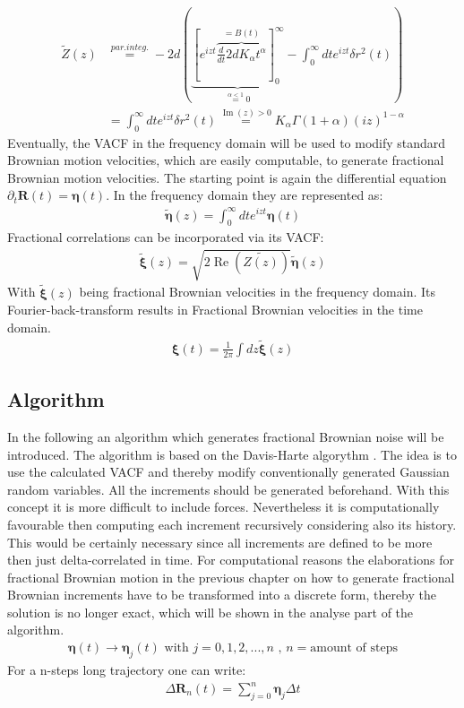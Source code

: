 \documentclass[
  a4paper,BCOR10mm,oneside,
  bibtotoc,idxtotoc,
  headsepline,footsepline,%
  fleqn,openbib
]{scrbook}
\begin{document}
\begin{align*}
 \tilde{Z}(z) & \stackrel{par. integ.}{=} - 2d \left( \underbrace{\left [ e^{izt}\overbrace{ \frac{d}{dt} 2dK_{\alpha}t^{\alpha}}^{=B(t)} \right]_{0}^{\infty}}_{\stackrel{\alpha < 1} {=} 0}-\int_{0}^{\infty} d t e^{izt} \delta r^2 (t) \right) \\
  & = \int_{0}^{\infty} d t e^{izt} \delta r^2 (t)  \stackrel{\operatorname{Im}(z)> 0} {=}  K_{\alpha} \Gamma(1+\alpha)(i z)^{1-\alpha}
\end{align*}
Eventually, the VACF in the frequency domain will be used to modify standard Brownian motion velocities, which are easily computable, to generate fractional Brownian motion velocities. The  starting point is again the differential equation $\partial_t \bm{R}(t)=\bm{\eta}(t)$. In the frequency domain they are represented as:
\begin{align}
 \tilde{\bm{\eta}}(z)=\int_{0}^{\infty} dt e^{izt} \bm{\eta}(t) \label{eq:fourier}
\end{align}
Fractional correlations can be incorporated via its VACF:
\begin{align}
\tilde{\bm{\xi}}(z) = \sqrt{2 \operatorname{Re} \left(\tilde{Z(z)}\right)}  \tilde{\bm{\eta}}(z) \label{eq:fracvacf}
\end{align}
 With $\tilde{\bm{\xi}}(z)$ being fractional Brownian velocities in the frequency domain. Its Fourier-back-transform results in Fractional Brownian velocities in the time domain.
 \begin{align}
 \bm{\xi}(t)= \frac{1}{2 \pi} \int dz\tilde{\bm{\xi}}(z)
 \end{align}

\subsection{Algorithm}
In the following an algorithm which generates fractional Brownian noise will be introduced. The algorithm is based on the Davis-Harte algorythm \cite{Craigmile2003}. The idea is to use the calculated VACF and thereby modify conventionally generated Gaussian random variables.  All the increments should be generated beforehand. With this concept it is more difficult to include forces. Nevertheless it is computationally favourable then computing each increment recursively considering also its history. This would be certainly necessary since all increments are defined to be more then just delta-correlated in time. For computational reasons the elaborations for fractional Brownian motion in the previous chapter on how to generate fractional Brownian increments have to be transformed into a discrete form, thereby the solution is no longer exact, which will be shown in the analyse part of the algorithm.   
\begin{align}
\bm{\eta} (t) \longrightarrow \bm{\eta}_j(t)  \text{  with  } j=0,1,2,...,n  \text{  ,  } n= \text{amount of steps}
\end{align}
For a n-steps long trajectory one can write:
\begin{align}
 \Delta \bm{R}_n(t) =  \sum_{j=0}^n \bm{\eta}_j  \Delta t \label{eq:diskretdeltar}
\end{align}
\end{document}
